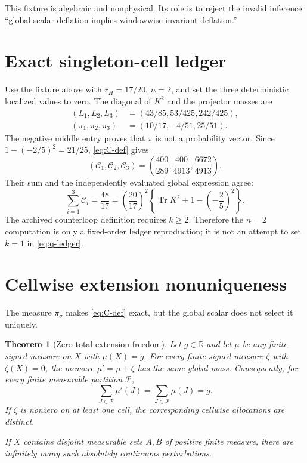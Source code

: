 \documentclass[11pt]{article}
\newtheorem{theorem}{Theorem}[section]
\theoremstyle{remark}
\newcommand{\Tr}{\operatorname{Tr}}
\newcommand{\cC}{\mathcal C}
\newcommand{\cP}{\mathcal P}
\begin{document}
This fixture is algebraic and nonphysical.  Its role is to reject the invalid
inference ``global scalar deflation implies windowwise invariant
deflation.''

\section{Exact singleton-cell ledger}

Use the fixture above with $r_H=17/20$, $n=2$, and set the three
deterministic localized values to zero.  The diagonal of $K^2$ and the
projector masses are
\begin{align}
 (L_1,L_2,L_3)&=(43/85,53/425,242/425),\label{eq:L-fixture}\\
 (\pi_1,\pi_2,\pi_3)&=(10/17,-4/51,25/51).
 \label{eq:pi-fixture}
\end{align}
The negative middle entry proves that $\pi$ is not a probability vector.
Since $1-(-2/5)^2=21/25$, \eqref{eq:C-def} gives
\begin{equation}\label{eq:C-fixture}
 (\cC_1,\cC_2,\cC_3)
 =\left(\frac{400}{289},\frac{400}{4913},
 \frac{6672}{4913}\right).
\end{equation}
Their sum and the independently evaluated global expression agree:
\begin{equation}\label{eq:C-total-fixture}
 \sum_{i=1}^3\cC_i
 =\frac{48}{17}
 =\left(\frac{20}{17}\right)^2
 \left\{\Tr K^2+1-\left(-\frac25\right)^2\right\}.
\end{equation}
The archived counterloop definition requires $k\ge2$.  Therefore the
$n=2$ computation is only a fixed-order ledger reproduction; it is not an
attempt to set $k=1$ in \eqref{eq:q-ledger}.

\section{Cellwise extension nonuniqueness}

The measure $\pi_\sigma$ makes \eqref{eq:C-def} exact, but the global scalar
does not select it uniquely.

\begin{theorem}[Zero-total extension freedom]
\label{thm:extension-nonuniqueness}
Let $g\in\mathbb R$ and let $\mu$ be any finite signed measure on $X$ with
$\mu(X)=g$.  For every finite signed measure $\zeta$ with $\zeta(X)=0$,
the measure $\mu'=\mu+\zeta$ has the same global mass.  Consequently, for
every finite measurable partition $\cP$,
\begin{equation}\label{eq:partition-aggregate}
 \sum_{J\in\cP}\mu'(J)
 =\sum_{J\in\cP}\mu(J)=g.
\end{equation}
If $\zeta$ is nonzero on at least one cell, the corresponding cellwise
allocations are distinct.

If $X$ contains disjoint measurable sets $A,B$ of positive finite measure,
there are infinitely many such absolutely continuous perturbations.
\end{theorem}
\end{document}
